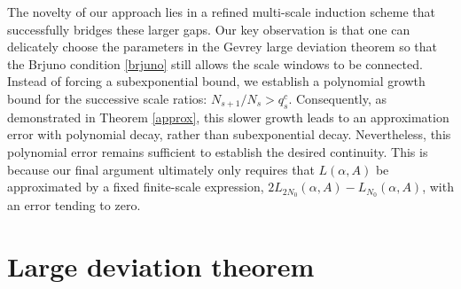 \documentclass[reqno,12pt]{amsart}
\theoremstyle{plain}
\theoremstyle{definition}
\numberwithin{equation}{section}
\begin{document}
The novelty of our approach lies in a refined multi-scale induction scheme that successfully bridges these larger gaps. Our key observation is that one can delicately choose the parameters in the Gevrey large deviation theorem so that the Brjuno condition \eqref{brjuno} still allows the scale windows to be connected. Instead of forcing a subexponential bound, we establish a polynomial growth bound for the successive scale ratios: $N_{s+1}/N_{s} > q_{s}^{c}$. Consequently, as demonstrated in Theorem \ref{approx}, this slower growth leads to an approximation error with polynomial decay, rather than subexponential decay. Nevertheless, this polynomial error remains sufficient to establish the desired continuity. This is because our final argument ultimately only requires that $L(\alpha,A)$ be approximated by a fixed finite-scale expression, $2L_{2N_0}(\alpha,A)-L_{N_0}(\alpha,A)$, with an error tending to zero.











\section{Large deviation theorem}
\end{document}

